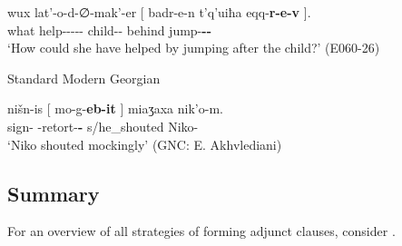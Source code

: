 	\begin{exe}
		\ex\label{man-ex4}
		\gll wux	lat'-o-d-∅-mak'-er	{{\normalfont[} badr-e-n}	t'q'uiħa	{eqq-\textbf{r-e-v} {\normalfont]}}.  \\
		what	help-{\Npst}-{\D}-{\Tr}-{\Pot}-{\Imprf}	child-{\Obl}-{\Dat}	behind	jump-\textbf{{\Vn}-{\Obl}-{\Ins}}    \\
		\trans `How could she have helped by jumping after the child?’	
		\hfill (E060-26)
	\end{exe}



	\begin{exe}
		\ex\label{man-ex5}
		Standard Modern Georgian
        
		\gll nišn-is	{{\normalfont[} mo-g-\textbf{eb-it} {\normalfont]}}	miaʒaxa	nik'o-m.	\\
		sign-{\Gen}	{\Pv}-retort-\textbf{{\Vn}-{\Ins}}	s/he\_shouted	Niko-{\Erg}	\\
		\trans `Niko shouted mockingly’
		\hfill (GNC: E. Akhvlediani)
	\end{exe}



\subsection{Summary}\label{adjunctsum}

For an overview of all strategies of forming adjunct clauses, consider .


